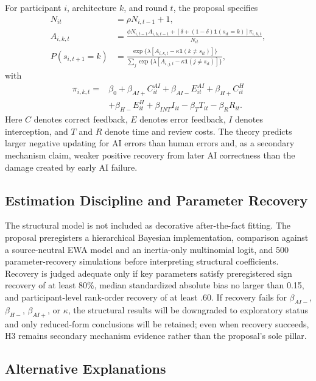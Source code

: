 \documentclass[man,natbib]{apa7}
\begin{document}
For participant $i$, architecture $k$, and round $t$, the proposal specifies
\begin{align*}
N_{it} &= \rho N_{i,t-1} + 1, \\
A_{i,k,t} &= \frac{\phi N_{i,t-1}A_{i,k,t-1} + [\delta + (1-\delta)\mathbf{1}(s_{it}=k)]\pi_{i,k,t}}{N_{it}}, \\
P(s_{i,t+1}=k) &= \frac{\exp\{\lambda[A_{i,k,t} - \kappa \mathbf{1}(k \neq s_{it})]\}}{\sum_j \exp\{\lambda[A_{i,j,t} - \kappa \mathbf{1}(j \neq s_{it})]\}},
\end{align*}
with
\begin{align*}
\pi_{i,k,t} ={}& \beta_0 + \beta_{AI+}C^{AI}_{it} + \beta_{AI-}E^{AI}_{it} + \beta_{H+}C^{H}_{it} \\
&+ \beta_{H-}E^{H}_{it} + \beta_{INT}I_{it} - \beta_T T_{it} - \beta_R R_{it}.
\end{align*}
Here $C$ denotes correct feedback, $E$ denotes error feedback, $I$ denotes interception, and $T$ and $R$ denote time and review costs. The theory predicts larger negative updating for AI errors than human errors and, as a secondary mechanism claim, weaker positive recovery from later AI correctness than the damage created by early AI failure.

\subsection{Estimation Discipline and Parameter Recovery}

The structural model is not included as decorative after-the-fact fitting. The proposal preregisters a hierarchical Bayesian implementation, comparison against a source-neutral EWA model and an inertia-only multinomial logit, and 500 parameter-recovery simulations before interpreting structural coefficients. Recovery is judged adequate only if key parameters satisfy preregistered sign recovery of at least 80\%, median standardized absolute bias no larger than 0.15, and participant-level rank-order recovery of at least .60. If recovery fails for $\beta_{AI-}$, $\beta_{H-}$, $\beta_{AI+}$, or $\kappa$, the structural results will be downgraded to exploratory status and only reduced-form conclusions will be retained; even when recovery succeeds, H3 remains secondary mechanism evidence rather than the proposal's sole pillar.

\subsection{Alternative Explanations}
\end{document}
